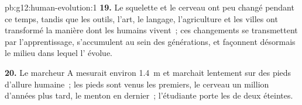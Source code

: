\begin{solution}{pb:g12:human-evolution:1}
\textbf{19.} Le squelette et le cerveau ont peu changé pendant ce
temps, tandis que les outils, l'art, le langage, l'agriculture et les
villes ont transformé la manière dont les humains vivent~; ces
changements se transmettent par l'apprentissage, s'accumulent au sein
des générations, et façonnent désormais le milieu dans lequel l'
évolue.

\textbf{20.} Le marcheur A mesurait environ \qty{1.4}{m} et marchait
lentement sur des pieds d'allure humaine~; les pieds sont venus les
premiers, le cerveau un million d'années plus tard, le menton en
dernier~; l'étudiante porte les  de deux  éteintes.
\end{solution}
